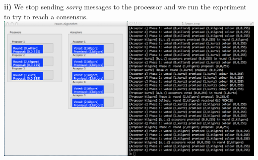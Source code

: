 \documentclass[a4paper, 11pt]{article}
\begin{document}
\textbf{ii)} We stop sending \textit{sorry} messages to the processor and we run the experiment to try to reach a consensus.\\
\includegraphics[scale=0.35]{images/exp4.png} \\\\
\end{document}
